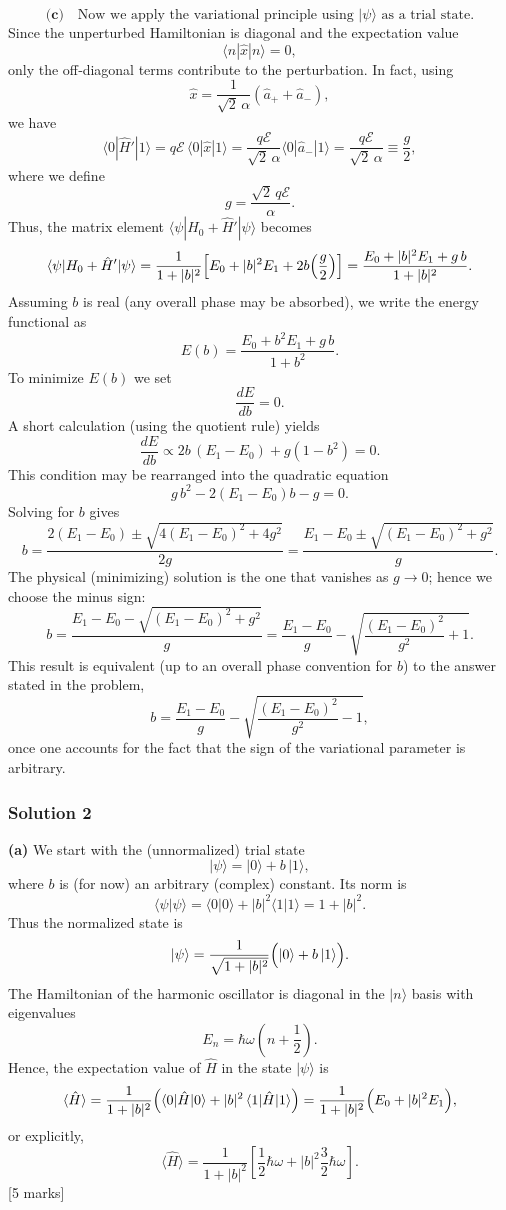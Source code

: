 \documentclass{article}
\begin{document}
\[
\textbf{(c)}\quad\text{Now we apply the variational principle using } |\psi\rangle \text{ as a trial state.}
\]
Since the unperturbed Hamiltonian is diagonal and the expectation value
\[
\langle n|\hat{x}|n\rangle=0,
\]
only the off‐diagonal terms contribute to the perturbation. In fact, using
\[
\hat{x} = \frac{1}{\sqrt{2}\,\alpha}(\hat{a}_++\hat{a}_-),
\]
we have
\[
\langle 0|\hat{H}'|1\rangle = q\mathcal{E}\,\langle 0|\hat{x}|1\rangle
=\frac{q\mathcal{E}}{\sqrt{2}\,\alpha}\langle 0|\hat{a}_-|1\rangle
=\frac{q\mathcal{E}}{\sqrt{2}\,\alpha}\equiv \frac{g}{2},
\]
where we define
\[
g=\frac{\sqrt{2}\,q\mathcal{E}}{\alpha}.
\]
Thus, the matrix element \( \langle\psi|H_0+\hat{H}'|\psi\rangle \) becomes
\[
\langle\psi|H_0+\hat{H}'|\psi\rangle
=\frac{1}{1+|b|^2}\Bigl[E_0+|b|^2E_1 + 2b\Bigl(\frac{g}{2}\Bigr)\Bigr]
=\frac{E_0+|b|^2E_1 + g\,b}{1+|b|^2}.
\]
Assuming \( b \) is real (any overall phase may be absorbed), we write the energy functional as
\[
E(b)=\frac{E_0+b^2E_1+g\,b}{1+b^2}.
\]
To minimize \( E(b) \) we set
\[
\frac{dE}{db}=0.
\]
A short calculation (using the quotient rule) yields
\[
\frac{dE}{db} \propto 2b\,(E_1-E_0)+g(1-b^2)=0.
\]
This condition may be rearranged into the quadratic equation
\[
g\,b^2-2(E_1-E_0)b-g=0.
\]
Solving for \( b \) gives
\[
b=\frac{2(E_1-E_0)\pm\sqrt{4(E_1-E_0)^2+4g^2}}{2g}
=\frac{E_1-E_0\pm\sqrt{(E_1-E_0)^2+g^2}}{g}.
\]
The physical (minimizing) solution is the one that vanishes as \( g\to 0 \); hence we choose the minus sign:
\[
b=\frac{E_1-E_0-\sqrt{(E_1-E_0)^2+g^2}}{g}
=\frac{E_1-E_0}{g}-\sqrt{\frac{(E_1-E_0)^2}{g^2}+1}.
\]
This result is equivalent (up to an overall phase convention for \( b \)) to the answer stated in the problem,
\[
b=\frac{E_1-E_0}{g}-\sqrt{\frac{(E_1-E_0)^2}{g^2}-1},
\]
once one accounts for the fact that the sign of the variational parameter is arbitrary.


\subsubsection{Solution 2}
\textbf{(a)} We start with the (unnormalized) trial state
\[
|\psi\rangle = |0\rangle + b\,|1\rangle,
\]
where \(b\) is (for now) an arbitrary (complex) constant. Its norm is
\[
\langle \psi|\psi\rangle = \langle 0|0\rangle + |b|^2\langle 1|1\rangle = 1 + |b|^2.
\]
Thus the normalized state is
\[
|\psi\rangle = \frac{1}{\sqrt{1+|b|^2}}\Bigl(|0\rangle + b\,|1\rangle\Bigr).
\]
The Hamiltonian of the harmonic oscillator is diagonal in the \(|n\rangle\) basis with eigenvalues
\[
E_n = \hbar\omega\left(n+\frac{1}{2}\right).
\]
Hence, the expectation value of \(\hat{H}\) in the state \(|\psi\rangle\) is
\[
\langle \hat{H}\rangle = \frac{1}{1+|b|^2}\Bigl(\langle 0|\hat{H}|0\rangle + |b|^2\,\langle 1|\hat{H}|1\rangle\Bigr)
=\frac{1}{1+|b|^2}\Bigl(E_0 + |b|^2E_1\Bigr),
\]
or explicitly,
\[
\langle \hat{H}\rangle = \frac{1}{1+|b|^2}\left[\frac{1}{2}\hbar\omega + |b|^2\frac{3}{2}\hbar\omega\right].
\]
\hfill [5 marks]
\end{document}

